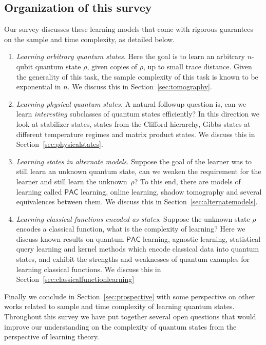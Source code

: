 \documentclass[11pt]{article}
\newcommand{\PAC}{\ensuremath{\mathsf{PAC}}}
\begin{document}

\subsection{Organization of this survey} 
Our survey discusses these learning models that come with rigorous guarantees on the sample and time complexity, as detailed below. 
\begin{enumerate}
    \item \emph{Learning arbitrary quantum states.} Here the goal is to learn an arbitrary  $n$-qubit quantum state $\rho$, given copies of $\rho$, up to  small trace distance. Given the generality of this task, the sample complexity  of this task is known to be exponential in $n$. We discuss this in Section~\ref{sec:tomography}.
    \item \emph{Learning physical quantum states.} A natural followup question is, can we learn \emph{interesting} subclasses of quantum states efficiently? In this direction we look at stabilizer states, states from the Clifford hierarchy, Gibbs states at different temperature regimes and matrix product states. We discuss this in Section~\ref{sec:physicalstates}. 
    
    \item \emph{Learning states in alternate models.} Suppose the goal of the learner was to still learn an unknown quantum state, can we weaken the requirement for the learner and still learn the unknown~$\rho$?  To this end, there are models of learning called $\PAC$ learning, online learning, shadow tomography and several equivalences between them. We discuss this in Section~\ref{sec:alternatemodels}.
    \item \emph{Learning classical functions encoded as states.} Suppose the unknown state $\rho$ encodes a classical function, what is the complexity of learning? Here we discuss known results on quantum $\PAC$ learning, agnostic learning, statistical query learning and kernel methods which encode classical data into quantum states, and exhibit the strengths and weaknesses of  quantum examples for learning classical functions.  We discuss this in Section~\ref{sec:classicalfunctionlearning}
\end{enumerate}
Finally we conclude in Section~\ref{sec:prospective} with some perspective on other works related to sample and time complexity of learning quantum states. Throughout this  survey we have put together several open questions that would improve our understanding on the complexity of quantum states from the perspective of learning theory.
\end{document}
